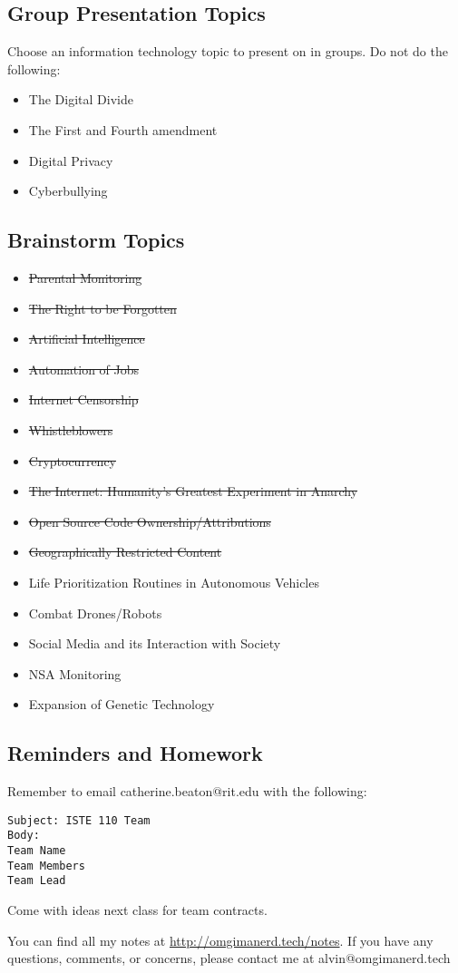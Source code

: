 \documentclass[letterpaper, 12pt]{article}
\begin{document}
\subsection*{Group Presentation Topics}
Choose an information technology topic to present on in groups. Do not do the
following:
\begin{itemize}
  \item The Digital Divide
  \item The First and Fourth amendment
  \item Digital Privacy
  \item Cyberbullying
\end{itemize}

\subsection*{Brainstorm Topics}
\begin{itemize}
  \item \sout{Parental Monitoring}
  \item \sout{The Right to be Forgotten}
  \item \sout{Artificial Intelligence}
  \item \sout{Automation of Jobs}
  \item \sout{Internet Censorship}
  \item \sout{Whistleblowers}
  \item \sout{Cryptocurrency}
  \item \sout{The Internet: Humanity's Greatest Experiment in Anarchy}
  \item \sout{Open Source Code Ownership/Attributions}
  \item \sout{Geographically Restricted Content}
  \item Life Prioritization Routines in Autonomous Vehicles
  \item Combat Drones/Robots
  \item Social Media and its Interaction with Society
  \item NSA Monitoring
  \item Expansion of Genetic Technology
\end{itemize}

\subsection*{Reminders and Homework}
Remember to email catherine.beaton@rit.edu with the following:
\begin{verbatim}
Subject: ISTE 110 Team
Body:
Team Name
Team Members
Team Lead
\end{verbatim}
Come with ideas next class for team contracts.

\begin{center}
  You can find all my notes at \url{http://omgimanerd.tech/notes}. If you have
  any questions, comments, or concerns, please contact me at
  alvin@omgimanerd.tech
\end{center}
\end{document}
